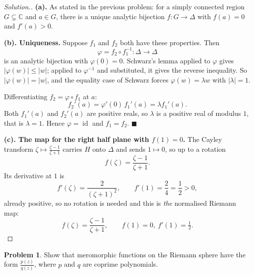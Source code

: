 \documentclass[11pt,a4paper]{article}
\theoremstyle{definition}
\newtheorem{problemx}{Problem}[section]
\newenvironment{problem}{\begin{problemx}}{\end{problemx}}
\newenvironment{solution}
  {\renewcommand{\qedsymbol}{}\begin{proof}[\textit{Solution}.]}
  {\end{proof}}
\begin{document}
\begin{solution}
\textbf{(a).} As stated in the previous problem: for a simply connected region
$G \subsetneq \mathbb{C}$ and $a \in G$, there is a unique analytic bijection
$f : G \rightarrow \Delta$ with $f(a) = 0$ and $f'(a) > 0$.

\textbf{(b). Uniqueness.} Suppose $f_1$ and $f_2$ both have these properties. Then
$$\varphi = f_2 \circ f_1^{-1} : \Delta \rightarrow \Delta$$
is an analytic bijection with $\varphi(0) = 0$. Schwarz's lemma applied to
$\varphi$ gives $\left|\varphi(w)\right| \leq \left|w\right|$; applied to
$\varphi^{-1}$ and substituted, it gives the reverse inequality. So
$\left|\varphi(w)\right| = \left|w\right|$, and the equality case of Schwarz
forces $\varphi(w) = \lambda w$ with $\left|\lambda\right| = 1$.

Differentiating $f_2 = \varphi \circ f_1$ at $a$:
$$f_2'(a) = \varphi'(0)\,f_1'(a) = \lambda f_1'(a).$$
Both $f_1'(a)$ and $f_2'(a)$ are positive reals, so $\lambda$ is a positive real of
modulus $1$, that is $\lambda = 1$. Hence $\varphi = \operatorname{id}$ and
$f_1 = f_2$. $\blacksquare$

\textbf{(c). The map for the right half plane with $f(1) = 0$.} The Cayley
transform $\zeta \mapsto \frac{\zeta-1}{\zeta+1}$ carries $H$ onto $\Delta$ and
sends $1 \mapsto 0$, so up to a rotation
$$f(\zeta) = \frac{\zeta - 1}{\zeta + 1}.$$
Its derivative at $1$ is
$$f'(\zeta) = \frac{2}{(\zeta+1)^{2}},
\qquad f'(1) = \frac{2}{4} = \frac12 > 0 ,$$
already positive, so no rotation is needed and this is \emph{the} normalised
Riemann map:
$$\boxed{f(\zeta) = \frac{\zeta-1}{\zeta+1},\qquad f(1) = 0,\ f'(1) = \tfrac12 .}$$
\end{solution}


\begin{problem}
Show that meromorphic functions on the Riemann sphere have the form
$\frac{p(z)}{q(z)}$, where $p$ and $q$ are coprime polynomials.
\end{problem}
\end{document}
